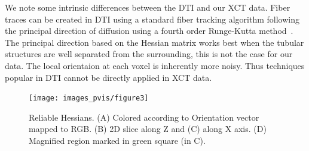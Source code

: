  
We note some intrinsic differences between the DTI and our XCT data. Fiber traces can be created in DTI using a standard fiber tracking algorithm following the principal direction of diffusion using a fourth order Runge-Kutta method~\cite{Brun2003}. The principal direction based on the Hessian matrix works best when the tubular structures are well separated from the surrounding, this is not the case for our data. The local orientaion at each voxel is inherently more noisy. Thus techniques popular in DTI cannot be directly applied in XCT data.

%
\begin{figure}[tb]
\centering
\texttt{[image: images\_pvis/figure3]}
\caption{Reliable Hessians. (A) Colored according to Orientation vector mapped to RGB. (B) 2D slice along Z and (C) along X axis. (D) Magnified region marked in green square (in C).}
\label{fig:reliable_hessian}
\end{figure}


